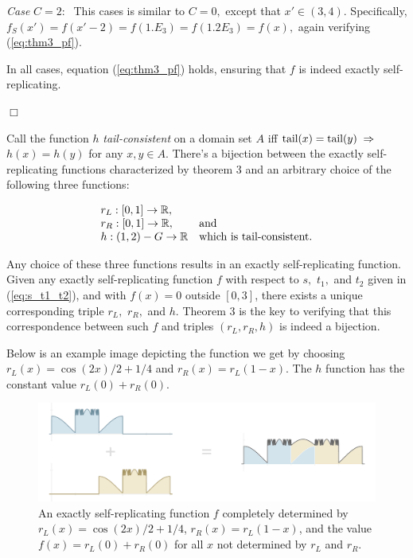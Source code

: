 \documentclass[20pt,]{extarticle}
\begin{document}
\emph{Case} \(C=2:\;\) This cases is similar to \(C=0,\) except that
\(x' \in (3,4).\) Specifically,
\(f_S(x') = f(x'-2) = f(1.E_3) = f(1.2E_3) = f(x),\) again verifying
(\ref{eq:thm3_pf}).

In all cases, equation (\ref{eq:thm3_pf}) holds, ensuring that \(f\) is
indeed exactly self-replicating.

\hfill\(\Box\)

Call the function \(h\) \emph{tail-consistent} on a domain set \(A\) iff
\(\text{tail}(x) = \text{tail}(y) \;\Rightarrow\;\) \(h(x) = h(y)\) for any
\(x,y \in A.\) There's a bijection between the exactly self-replicating
functions characterized by theorem 3 and an arbitrary choice of the
following three functions:

\[\begin{array}{ll}
r_L : [0,1] \to \mathbb{R}, \\
r_R : [0,1] \to \mathbb{R}, & \text{and} \\
h   : (1,2) - G \to \mathbb{R} & \text{which is tail-consistent.}
\end{array}\]

Any choice of these three functions results in an exactly
self-replicating function. Given any exactly self-replicating function
\(f\) with respect to \(s,\) \(t_1,\) and \(t_2\) given in
(\ref{eq:s_t1_t2}), and with \(f(x) = 0\) outside \([0,3]\), there
exists a unique corresponding triple \(r_L,\) \(r_R,\) and \(h\).
Theorem 3 is the key to verifying that this correspondence between such
\(f\) and triples \((r_L, r_R, h)\) is indeed a bijection.

Below is an example image depicting the function we get by choosing
\(r_L(x) = \cos(2x)/2 + 1/4\) and \(r_R(x) = r_L(1-x)\). The \(h\)
function has the constant value \(r_L(0) + r_R(0)\).

\begin{figure}[htbp]
\centering
\includegraphics{images/pdfs/nonplateau.pdf}
\caption{\label{fig:nonplateau}An exactly self-replicating function
\(f\) completely determined by \(r_L(x) = \cos(2x)/2 + 1/4\),
\(r_R(x) = r_L(1 - x)\), and the value \(f(x) = r_L(0) + r_R(0)\) for
all \(x\) not determined by \(r_L\) and \(r_R\).}\label{fig:nonplateau}
\end{figure}
\end{document}
